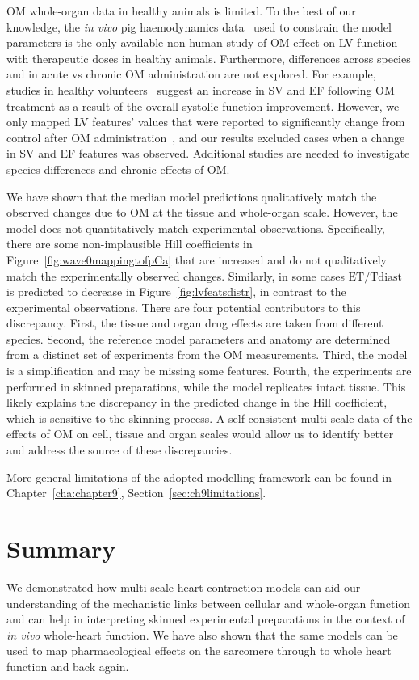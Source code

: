 \vspace{0.2cm}
OM whole-organ data in healthy animals is limited. To the best of our knowledge, the \textit{in vivo} pig haemodynamics data~\cite{Bakkehaug:2015} used to constrain the model parameters is the only available non-human study of OM effect on LV function with therapeutic doses in healthy animals. Furthermore, differences across species and in acute vs chronic OM administration are not explored. For example, studies in healthy volunteers~\cite{Teerlink:2011} suggest an increase in SV and EF following OM treatment as a result of the overall systolic function improvement. However, we only mapped LV features' values that were reported to significantly change from control after OM administration~\cite{Bakkehaug:2015}, and our results excluded cases when a change in SV and EF features was observed. Additional studies are needed to investigate species differences and chronic effects of OM.

\vspace{0.2cm}
We have shown that the median model predictions qualitatively match the observed changes due to OM at the tissue and whole-organ scale. However, the model does not quantitatively match experimental observations. Specifically, there are some non-implausible Hill coefficients in Figure~\ref{fig:wave0mappingtofpCa} that are increased and do not qualitatively match the experimentally observed changes. Similarly, in some cases $\textrm{ET}/\textrm{Tdiast}$ is predicted to decrease in Figure~\ref{fig:lvfeatsdistr}, in contrast to the experimental observations. There are four potential contributors to this discrepancy. First, the tissue and organ drug effects are taken from different species. Second, the reference model parameters and anatomy are determined from a distinct set of experiments from the OM measurements. Third, the model is a simplification and may be missing some features. Fourth, the experiments are performed in skinned preparations, while the model replicates intact tissue. This likely explains the discrepancy in the predicted change in the Hill coefficient, which is sensitive to the skinning process. A self-consistent multi-scale data of the effects of OM on cell, tissue and organ scales would allow us to identify better and address the source of these discrepancies.

\vspace{0.2cm}
More general limitations of the adopted modelling framework can be found in Chapter~\ref{cha:chapter9}, Section~\ref{sec:ch9limitations}.


%
%
%
\section{Summary}\label{sec:ch5summary}
We demonstrated how multi-scale heart contraction models can aid our understanding of the mechanistic links between cellular and whole-organ function and can help in interpreting skinned experimental preparations in the context of \textit{in vivo} whole-heart function. We have also shown that the same models can be used to map pharmacological effects on the sarcomere through to whole heart function and back again.